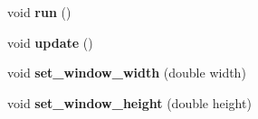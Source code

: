 \begin{DoxyCompactItemize}
\item 
\hypertarget{classGame_a1ab78f5ed0d5ea879157357cf2fb2afa}{void {\bfseries run} ()}\label{classGame_a1ab78f5ed0d5ea879157357cf2fb2afa}

\item 
\hypertarget{classGame_a79df6376b332d63c9eca0dcee30305c3}{void {\bfseries update} ()}\label{classGame_a79df6376b332d63c9eca0dcee30305c3}

\item 
\hypertarget{classGame_a9fbdae74cdfd2ceb1050091daeb78f02}{void {\bfseries set\-\_\-window\-\_\-width} (double width)}\label{classGame_a9fbdae74cdfd2ceb1050091daeb78f02}

\item 
\hypertarget{classGame_a4e95d3e5cf5935175a38785585619d44}{void {\bfseries set\-\_\-window\-\_\-height} (double height)}\label{classGame_a4e95d3e5cf5935175a38785585619d44}

\end{DoxyCompactItemize}

